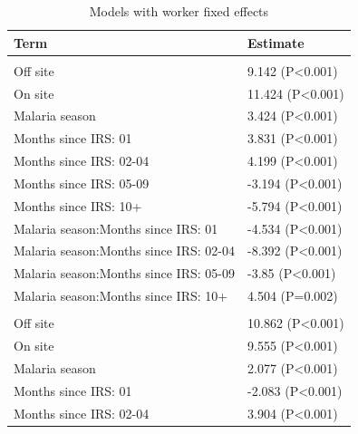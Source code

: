 \documentclass[]{article}
\begin{document}
\begin{table}

\caption{\label{tab:unnamed-chunk-18}Models with worker fixed effects}
\centering
\begin{tabular}[t]{ll}
\toprule
Term & Estimate\\
\midrule
\addlinespace[1.5em]
\multicolumn{2}{l}{\textbf{Permanent field worker}}\\
\hspace{1em}Off site & 9.142 (P<0.001)\\
\hspace{1em}On site & 11.424 (P<0.001)\\
\hspace{1em}Malaria season & 3.424 (P<0.001)\\
\hspace{1em}Months since IRS: 01 & 3.831 (P<0.001)\\
\hspace{1em}Months since IRS: 02-04 & 4.199 (P<0.001)\\
\hspace{1em}Months since IRS: 05-09 & -3.194 (P<0.001)\\
\hspace{1em}Months since IRS: 10+ & -5.794 (P<0.001)\\
\hspace{1em}Malaria season:Months since IRS: 01 & -4.534 (P<0.001)\\
\hspace{1em}Malaria season:Months since IRS: 02-04 & -8.392 (P<0.001)\\
\hspace{1em}Malaria season:Months since IRS: 05-09 & -3.85 (P<0.001)\\
\hspace{1em}Malaria season:Months since IRS: 10+ & 4.504 (P=0.002)\\
\addlinespace[1.5em]
\multicolumn{2}{l}{\textbf{Permanent not field worker}}\\
\hspace{1em}Off site & 10.862 (P<0.001)\\
\hspace{1em}On site & 9.555 (P<0.001)\\
\hspace{1em}Malaria season & 2.077 (P<0.001)\\
\hspace{1em}Months since IRS: 01 & -2.083 (P<0.001)\\
\hspace{1em}Months since IRS: 02-04 & 3.904 (P<0.001)\\

\end{tabular}
\end{table}
\end{document}
